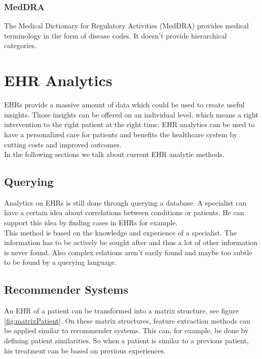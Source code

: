 \subsubsection{MedDRA}

The Medical Dictionary for Regulatory Activities (MedDRA) provides medical terminology in the form of disease codes. It doesn't provide hierarchical categories.

\section{EHR Analytics}

EHRs provide a massive amount of data which could be used to create useful insights. Those insights can be offered on an individual level, which means a right intervention to the right patient at the right time. EHR analytics can be used to have a personalized care for patients and benefits the healthcare system by cutting costs and improved outcomes. \\

In the following sections we talk about current EHR analytic methods.


\subsection{Querying}

Analytics on EHRs is still done through querying a database. A specialist can have a certain idea about correlations between conditions or patients. He can support this idea by finding cases in EHRs for example. \\
This method is based on the knowledge and experience of a specialist. The information has to be actively be sought after and thus a lot of other information is never found. Also complex relations aren't easily found and maybe too subtle to be found by a querying language.

\subsection{Recommender Systems}

An EHR of a patient can be transformed into a matrix structure, see figure \ref{fig:matrixPatient}. On these matrix structures, feature extraction methods can be applied similar to recommender systems. This can, for example, be done by defining patient similarities. So when a patient is similar to a previous patient, his treatment can be based on previous experiences.

